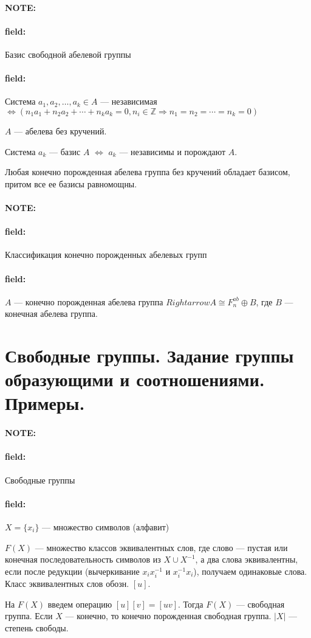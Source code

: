 \documentclass[12pt]{article}
\newenvironment{note}{\paragraph{NOTE:}}{}
\newenvironment{field}{\paragraph{field:}}{}
\begin{document}
\begin{note}
  \begin{field}
    Базис свободной абелевой группы
  \end{field}
  \begin{field}
    Система $a_{1}, a_{2}, \ldots, a_{k} \in A$ --- независимая
    $\Leftrightarrow (n_{1}a_{1} + n_{2}a_{2} + \cdots + n_{k}a_{k} = 0 , n_{i} \in \mathbb{Z} \Rightarrow n_{1} = n_{2} = \cdots = n_{k} = 0)$

    $A$ --- абелева без кручений.

    Система $a_{k}$ --- базис $A$ $\Leftrightarrow$ $a_{k}$ --- независимы и порождают $A$.

    Любая конечно порожденная абелева группа без кручений обладает базисом, притом все ее базисы равномощны.
  \end{field}
\end{note}

\begin{note}
  \begin{field}
    Классификация конечно порожденных абелевых групп
  \end{field}
  \begin{field}
    $A$ --- конечно порожденная абелева группа
    $Rightarrow A \cong F_{n}^{ab} \oplus B$, где $B$ --- конечная абелева группа.
  \end{field}
\end{note}

\section{Свободные группы. Задание группы образующими и соотношениями. Примеры.}

\begin{note}
  \begin{field}
    Свободные группы
  \end{field}
  \begin{field}
    $X = \{x_{i}\}$ --- множество символов (алфавит)

    $F(X)$ --- множество классов эквивалентных слов, где слово --- пустая или
    конечная последовательность символов из $X \cup X^{-1}$, а два слова
    эквивалентны, если после редукции (вычеркивание $x_{i}x_{i}^{-1}$ и
    $x_{i}^{-1}x_{i}$), получаем одинаковые слова. Класс эквивалентных слов обозн. $[u]$.

    На $F(X)$ введем операцию $[u][v] = [uv]$. Тогда $F(X)$ --- свободная
    группа. Если $X$ --- конечно, то конечно порожденная свободная группа.
    $|X|$ --- степень свободы.
  \end{field}
\end{note}
\end{document}
